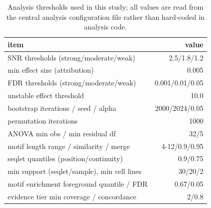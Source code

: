 \begin{table}[htbp]
\centering
\footnotesize
\caption{Analysis thresholds used in this study; all values are read from the central analysis configuration file rather than hard-coded in analysis code.}
\label{tab:methods}
\begin{tabular}{lr}
\toprule
item & value \\
\midrule
SNR thresholds (strong/moderate/weak) & 2.5/1.8/1.2 \\
min effect size (attribution) & 0.005 \\
FDR thresholds (strong/moderate/weak) & 0.001/0.01/0.05 \\
unstable effect threshold & 10.0 \\
bootstrap iterations / seed / alpha & 2000/2024/0.05 \\
permutation iterations & 1000 \\
ANOVA min obs / min residual df & 32/5 \\
motif length range / similarity / merge & 4-12/0.9/0.95 \\
seqlet quantiles (position/continuity) & 0.9/0.75 \\
min support (seqlet/sample), min cell lines & 30/20/2 \\
motif enrichment foreground quantile / FDR & 0.67/0.05 \\
evidence tier min coverage / concordance & 2/0.8 \\
\bottomrule
\end{tabular}
\end{table}
